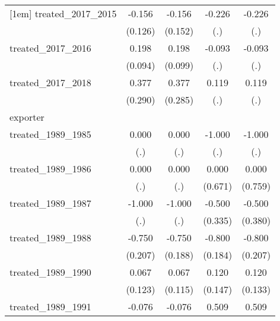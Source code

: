 {\begin{tabular}{l*{4}{c}}
[1em]
treated\_2017\_2015&      -0.156         &      -0.156         &      -0.226         &      -0.226         \\
            &     (0.126)         &     (0.152)         &         (.)         &         (.)         \\
[1em]
treated\_2017\_2016&       0.198\sym{*}  &       0.198\sym{*}  &      -0.093         &      -0.093         \\
            &     (0.094)         &     (0.099)         &         (.)         &         (.)         \\
[1em]
treated\_2017\_2018&       0.377         &       0.377         &       0.119         &       0.119         \\
            &     (0.290)         &     (0.285)         &         (.)         &         (.)         \\
\hline
exporter    &                     &                     &                     &                     \\
treated\_1989\_1985&       0.000         &       0.000         &      -1.000         &      -1.000         \\
            &         (.)         &         (.)         &         (.)         &         (.)         \\
[1em]
treated\_1989\_1986&       0.000         &       0.000         &       0.000         &       0.000         \\
            &         (.)         &         (.)         &     (0.671)         &     (0.759)         \\
[1em]
treated\_1989\_1987&      -1.000         &      -1.000         &      -0.500         &      -0.500         \\
            &         (.)         &         (.)         &     (0.335)         &     (0.380)         \\
[1em]
treated\_1989\_1988&      -0.750\sym{***}&      -0.750\sym{***}&      -0.800\sym{***}&      -0.800\sym{***}\\
            &     (0.207)         &     (0.188)         &     (0.184)         &     (0.207)         \\
[1em]
treated\_1989\_1990&       0.067         &       0.067         &       0.120         &       0.120         \\
            &     (0.123)         &     (0.115)         &     (0.147)         &     (0.133)         \\
[1em]
treated\_1989\_1991&      -0.076         &      -0.076         &       0.509         &       0.509         \\

\end{tabular}}
